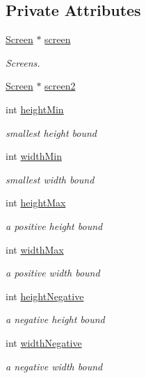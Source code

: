 \subsection*{Private Attributes}
\begin{DoxyCompactItemize}
\item 
\hyperlink{classScreen}{Screen} $\ast$ \hyperlink{classScreenTest_af1600b7ee78b7292084cad1902fc0b65}{screen}
\begin{DoxyCompactList}\small\item\em Screens. \end{DoxyCompactList}\item 
\hyperlink{classScreen}{Screen} $\ast$ \hyperlink{classScreenTest_a7953fa476ae723c712ca44ea5336dd8b}{screen2}
\item 
int \hyperlink{classScreenTest_ae40c862539e810eecfc3bd07250dd630}{height\-Min}
\begin{DoxyCompactList}\small\item\em smallest height bound \end{DoxyCompactList}\item 
int \hyperlink{classScreenTest_a226ac6b531b24a7e858f92ae6ecfc326}{width\-Min}
\begin{DoxyCompactList}\small\item\em smallest width bound \end{DoxyCompactList}\item 
int \hyperlink{classScreenTest_a6a160dcd61b42aaa5b59fe7c0336f65d}{height\-Max}
\begin{DoxyCompactList}\small\item\em a positive height bound \end{DoxyCompactList}\item 
int \hyperlink{classScreenTest_ad96290caf1612456f32e6ec760184421}{width\-Max}
\begin{DoxyCompactList}\small\item\em a positive width bound \end{DoxyCompactList}\item 
int \hyperlink{classScreenTest_a7bdca9dbaf4acbc80516502d91ad6a8e}{height\-Negative}
\begin{DoxyCompactList}\small\item\em a negative height bound \end{DoxyCompactList}\item 
int \hyperlink{classScreenTest_a6dcea4998a473e9c5fbc7e3bfa074ab4}{width\-Negative}
\begin{DoxyCompactList}\small\item\em a negative width bound \end{DoxyCompactList}\end{DoxyCompactItemize}


